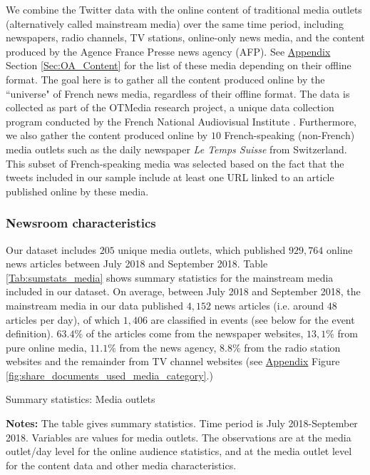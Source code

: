 We combine the Twitter data with the online content of traditional media outlets (alternatively called mainstream media) over the same time period, including newspapers, radio channels, TV stations, online-only news media, and the content produced by the Agence France Presse news agency (AFP).  See  \hyperlink{ref:Appendix}{Appendix} Section \ref{Sec:OA_Content} for the list of these media depending on their offline format. The goal here is to gather all the content produced online by the ``universe" of French news media, regardless of their offline format. The data is collected as part of the OTMedia research project, a unique data collection program conducted by the French National Audiovisual Institute \citep{CageHerveViaud2020}. Furthermore, we also gather the content produced online by $10$ French-speaking (non-French) media outlets such as the daily newspaper \textit{Le Temps Suisse} from Switzerland. This subset of French-speaking media was selected based on the fact that the tweets included in our sample include at least one URL linked to an article published online by these media.


\subsubsection{Newsroom characteristics}

Our dataset includes $205$ unique media outlets, which published $929,764$ online news articles between July 2018 and September 2018. Table \ref{Tab:sumstats_media} shows summary statistics for the mainstream media included in our dataset. On average, between July 2018 and September 2018, the mainstream media in our data published $4,152$ news articles (i.e. around $48$ articles per day), of which $1,406$ are classified in events (see below for the event definition). $63.4\%$ of the articles come from the newspaper websites,  $13,1\%$ from pure online media, $11.1\%$ from the news agency, $8.8\%$ from the radio station websites and the remainder from TV channel websites (see \hyperlink{ref:Appendix}{Appendix} Figure \ref{fig:share_documents_used_media_category}.)


\begin{table}
\caption{Summary statistics: Media outlets}
\begin{center}
	
\end{center}
\begin{spacing}{0.5}
	{\fns \textbf{Notes:} The table gives summary statistics. Time period is July 2018-September 2018. Variables are values for media outlets. The observations are at the media outlet/day level for the online audience statistics, and at the media outlet level for the content data and other media characteristics.} 
\end{spacing}
\label{Tab:sumstats_media}
\end{table} 


